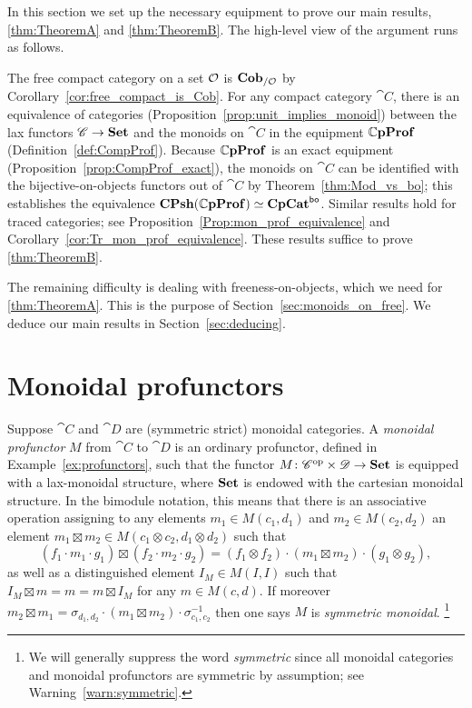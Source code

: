 \documentclass[11pt,oneside,article]{memoir}
\begin{document}
In this section we set up the necessary equipment to prove our main results, \ref{thm:TheoremA} and
\ref{thm:TheoremB}. The high-level view of the argument runs as follows.

The free compact category on a set $\mathcal{O}$ is $\mathbf{Cob}_{/\mathcal{O}}$ by
Corollary~\ref{cor:free_compact_is_Cob}. For any compact category $\cat{C}$, there is an equivalence
of categories (Proposition~\ref{prop:unit_implies_monoid}) between the lax functors $\mathscr{C}\to\mathbf{Set}$
and the monoids on $\cat{C}$ in the equipment $\mathbb{C}\mathbf{pProf}$ (Definition~\ref{def:CompProf}). Because
$\mathbb{C}\mathbf{pProf}$ is an exact equipment (Proposition~\ref{prop:CompProf_exact}), the monoids on $\cat{C}$
can be identified with the bijective-on-objects functors out of $\cat{C}$ by
Theorem~\ref{thm:Mod_vs_bo}; this establishes the equivalence
$\mathbf{CPsh}(\mathbb{C}\mathbf{pProf})\simeq\mathbf{CpCat}^{\mathsf{bo}}$. Similar results hold for traced categories; see
Proposition~\ref{Prop:mon_prof_equivalence} and Corollary~\ref{cor:Tr_mon_prof_equivalence}. These
results suffice to prove \ref{thm:TheoremB}.

The remaining difficulty is dealing with freeness-on-objects, which we need for \ref{thm:TheoremA}.
This is the purpose of Section~\ref{sec:monoids_on_free}. We deduce our main results in
Section~\ref{sec:deducing}.

\section{Monoidal profunctors}
      \label{sec:monoidal_profunctors}

Suppose $\cat{C}$ and $\cat{D}$ are (symmetric strict) monoidal categories. A \emph{monoidal
profunctor} $M$ from $\cat{C}$ to $\cat{D}$ is an ordinary profunctor, defined in
Example~\ref{ex:profunctors}, such that the functor $M\colon {\mathscr{C}}^{\text{op}}\times\mathscr{D}\to\mathbf{Set}$ is
equipped with a lax-monoidal structure, where $\mathbf{Set}$ is endowed with the cartesian monoidal
structure. In the bimodule notation, this means that there is an associative operation assigning to
any elements $m_1\in M(c_1,d_1)$ and $m_2\in M(c_2,d_2)$ an element $m_1\boxtimes m_2\in
M(c_1\otimes c_2,d_1\otimes d_2)$ such that
\[
   (f_1\cdot m_1\cdot g_1)\boxtimes(f_2\cdot m_2\cdot g_2)
      = (f_1\otimes f_2)\cdot(m_1\boxtimes m_2)\cdot(g_1\otimes g_2),
\]
as well as a distinguished element $I_M\in M(I,I)$ such that $I_M\boxtimes m = m = m\boxtimes I_M$
for any $m\in M(c,d)$. If moreover $m_2\boxtimes m_1 = \sigma_{d_1,d_2}\cdot(m_1\boxtimes
m_2)\cdot\sigma_{c_1,c_2}^{-1}$ then one says $M$ is \emph{symmetric monoidal}.%
\footnote{
   We will generally suppress the word \emph{symmetric} since all monoidal categories and monoidal
   profunctors are symmetric by assumption; see Warning~\ref{warn:symmetric}.
}
\end{document}
